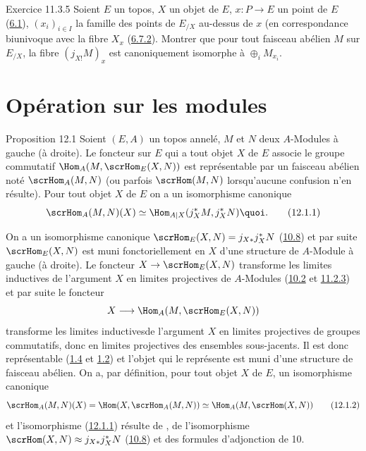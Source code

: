 \documentclass[10pt]{../fichiers-configuration-latex/smfart}
\begin{document}
\begin{enonce*}[remark]{Exercice 11.3.5}
Soient $E$ un topos, $X$ un objet de $E$, $x:P\rightarrow E$ un
point de $E$ (\hyperref[IV.def6.1]{6.1}), $(x_i)_{i\in I}$ la famille des
points de $E_{/X}$ au-dessus de $x$ (en correspondance biunivoque
avec la fibre $X_x$ (\hyperref[IV.eq6.7.2]{6.7.2}). Montrer que pour tout
faisceau abélien $M$ sur $E_{/X}$, la fibre $(j_{X!}M)_x$ est
canoniquement isomorphe à $\oplus_i M_{x_i}$.
\end{enonce*}

\section{Opération sur les modules}

\begin{enonce*}{Proposition 12.1}
Soient $(E,A)$ un topos annelé, $M$ et $N$ deux $A$-Modules à gauche
(\resp à droite). Le foncteur sur $E$ qui a tout objet $X$ de $E$
associe le groupe commutatif $\Hom_A(M,\scrHom_E(X,N))$ est
représentable par un faisceau abélien noté $\scrHom_A(M,N)$ (ou
parfois $\scrHom(M,N)$ lorsqu'aucune confusion n'en résulte). Pour
tout objet $X$ de $E$ on a un isomorphisme canonique
\begin{equation*}
\scrHom_A(M,N)(X)\simeq \Hom_{A| X}(j^{\ast}_XM,
j^{\ast}_XN){\quoi}.\tag{12.1.1}
\end{equation*}
\end{enonce*}

On a un isomorphisme canonique $\scrHom_E(X,N)=j_{X\ast}j^{\ast}_XN$
(\hyperref[IV.cor10.8]{10.8}) et par suite $\scrHom_E(X,N)$ est muni
fonctoriellement en $X$ d'une structure de $A$-Module à gauche
(\resp à droite). Le foncteur $X\rightarrow \scrHom_E(X,N)$
transforme les limites inductives de l'argument $X$ en limites
projectives de $A$-Modules (\hyperref[IV.subsec10.2]{10.2} et
\hyperref[IV.subsubsec11.2.3]{11.2.3}) et par suite le foncteur
$$
X\longrightarrow \Hom_A(M,\scrHom_E(X,N))
$$
transforme les limites inductives\pageoriginale de l'argument $X$ en
limites projectives de groupes commutatifs, donc en limites
projectives des ensembles sous-jacents. Il est donc représentable
(\hyperref[IV.prop1.4]{1.4} et \hyperref[IV.theo1.2]{1.2}) et l'objet qui le représente
est muni d'une structure de faisceau abélien. On a, par définition,
pour tout objet $X$ de $E$, un isomorphisme canonique
\begin{equation*}
\scrHom_A(M,N)(X)=\Hom(X,\scrHom_A(M,N))\simeq
\Hom_A(M,\scrHom(X,N))\tag{12.1.2}
\end{equation*}
et l'isomorphisme (\hyperref[IV.eq12.1.1]{12.1.1}) résulte de , de
l'isomorphisme $\scrHom(X,N)\approx j_{X\ast}j^{\ast}_XN$
(\hyperref[IV.cor10.8]{10.8}) et des formules d'adjonction de 10.
\end{document}
